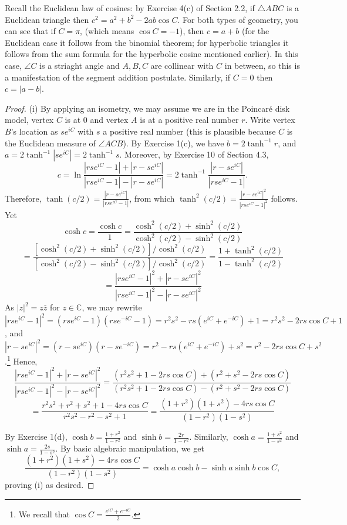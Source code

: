 \documentclass[leqno]{book}
\begin{document}
Recall the Euclidean law of cosines: by Exercise 4(c) of Section 2.2, if $\triangle ABC$ is a Euclidean triangle then $c^2=a^2+b^2-2ab\cos C$.  For both types of geometry, you can see that if $C=\pi$, (which means $\cos C=-1$), then $c=a+b$ (for the Euclidean case it follows from the binomial theorem; for hyperbolic triangles it follows from the sum formula for the hyperbolic cosine mentioned earlier).  In this case, $\angle C$ is a striaght angle and $A,B,C$ are collinear with $C$ in between, so this is a manifestation of the segment addition postulate.  Similarly, if $C=0$ then $c=|a-b|$.
\begin{proof}
(i) By applying an isometry, we may assume we are in the Poincar\'e disk model, vertex $C$ is at $0$ and vertex $A$ is at a positive real number $r$.  Write vertex $B$'s location as $se^{iC}$ with $s$ a positive real number (this is plausible because $C$ is the Euclidean measure of $\angle ACB$).  By Exercise 1(c), we have $b=2\tanh^{-1}r$, and $a=2\tanh^{-1}|se^{iC}|=2\tanh^{-1}s$.  Moreover, by Exercise 10 of Section 4.3,
$$c=\ln\frac{|rse^{iC}-1|+|r-se^{iC}|}{|rse^{iC}-1|-|r-se^{iC}|}=2\tanh^{-1}\frac{|r-se^{iC}|}{|rse^{iC}-1|}.$$
Therefore, $\tanh(c/2)=\frac{|r-se^{iC}|}{|rse^{iC}-1|}$, from which $\tanh^2(c/2)=\frac{|r-se^{iC}|^2}{|rse^{iC}-1|^2}$ follows.  Yet
$$\cosh c=\frac{\cosh c}1=\frac{\cosh^2(c/2)+\sinh^2(c/2)}{\cosh^2(c/2)-\sinh^2(c/2)}$$
$$=\frac{[\cosh^2(c/2)+\sinh^2(c/2)]/\cosh^2(c/2)}{[\cosh^2(c/2)-\sinh^2(c/2)]/\cosh^2(c/2)}=\frac{1+\tanh^2(c/2)}{1-\tanh^2(c/2)}$$
$$=\frac{|rse^{iC}-1|^2+|r-se^{iC}|^2}{|rse^{iC}-1|^2-|r-se^{iC}|^2}$$
As $|z|^2=z\overline z$ for $z\in\mathbb C$, we may rewrite $|rse^{iC}-1|^2=(rse^{iC}-1)(rse^{-iC}-1)=r^2s^2-rs(e^{iC}+e^{-iC})+1=r^2s^2-2rs\cos C+1$, and $|r-se^{iC}|^2=(r-se^{iC})(r-se^{-iC})=r^2-rs(e^{iC}+e^{-iC})+s^2=r^2-2rs\cos C+s^2$.\footnote{We recall that $\cos C=\frac{e^{iC}+e^{-iC}}2$.}  Hence,
$$\frac{|rse^{iC}-1|^2+|r-se^{iC}|^2}{|rse^{iC}-1|^2-|r-se^{iC}|^2}=\frac{(r^2s^2+1-2rs\cos C)+(r^2+s^2-2rs\cos C)}{(r^2s^2+1-2rs\cos C)-(r^2+s^2-2rs\cos C)}$$
$$=\frac{r^2s^2+r^2+s^2+1-4rs\cos C}{r^2s^2-r^2-s^2+1}=\frac{(1+r^2)(1+s^2)-4rs\cos C}{(1-r^2)(1-s^2)}$$

By Exercise 1(d), $\cosh b=\frac{1+r^2}{1-r^2}$ and $\sinh b=\frac{2r}{1-r^2}$.  Similarly, $\cosh a=\frac{1+s^2}{1-s^2}$ and $\sinh a=\frac{2s}{1-s^2}$.  By basic algebraic manipulation, we get
$$\frac{(1+r^2)(1+s^2)-4rs\cos C}{(1-r^2)(1-s^2)}=\cosh a\cosh b-\sinh a\sinh b\cos C,$$
proving (i) as desired.


\end{proof}
\end{document}
